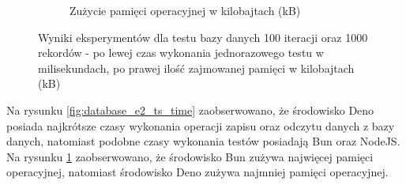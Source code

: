 \begin{figure}[H]
\begin{subfigure}[b]{0.44\textwidth}
    \caption{Zużycie pamięci operacyjnej w kilobajtach (kB)}
    \label{fig:database_e2_ts_memory}
  \end{subfigure}
  \caption{Wyniki eksperymentów dla testu bazy danych 100 iteracji oraz 1000 rekordów - po lewej czas wykonania jednorazowego testu w milisekundach, po prawej ilość zajmowanej pamięci w kilobajtach (kB)}
  \label{fig:database_e2_ts}
\end{figure}

Na rysunku \ref{fig:database_e2_ts_time} zaobserwowano, że środowisko Deno posiada najkrótsze czasy wykonania operacji zapisu oraz odczytu danych z bazy danych, natomiast podobne czasy wykonania testów posiadają Bun oraz NodeJS. Na rysunku \ref{fig:database_e2_ts_memory} zaobserwowano, że środowisko Bun zużywa najwięcej pamięci operacyjnej, natomiast środowisko Deno zużywa najmniej pamięci operacyjnej.